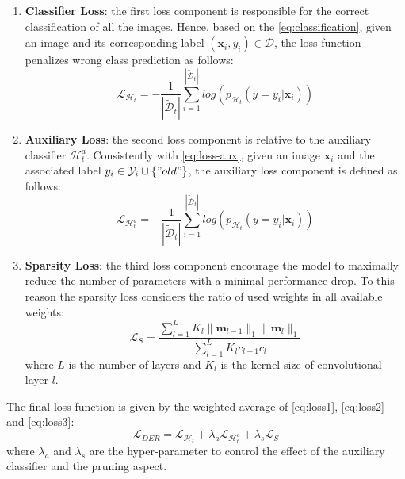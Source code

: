 \begin{enumerate}
    \item \textbf{Classifier Loss}: the first loss component is responsible for the correct classification of all the images. Hence, based on the \autoref{eq:classification}, given an image and its corresponding label $(\textbf{x}_i, y_i)\in \tilde{\mathcal{D}}$, the loss function penalizes wrong class prediction as follows:
    \begin{equation} \label{eq:loss1}
        \mathcal{L}_{\mathcal{H}_t} = - \frac{1}{|\tilde{\mathcal{D}}_t|}
            \sum_{i=1}^{|\tilde{\mathcal{D}}_t|}log(p_{\mathcal{H}_t}(y=y_i | \textbf{x}_i))
    \end{equation}
    \item \textbf{Auxiliary Loss}: the second loss component is relative to the auxiliary classifier $\mathcal{H}_t^a$. Consistently with \autoref{eq:loss-aux}, given an image $\textbf{x}_i$ and the associated label $y_i \in \mathcal{Y}_i \cup \{"old"\}$, the auxiliary loss component is defined as follows:
    \begin{equation} \label{eq:loss2}
        \mathcal{L}_{\mathcal{H}_t^a} = - \frac{1}{|\tilde{\mathcal{D}}_t|}
            \sum_{i=1}^{|\tilde{\mathcal{D}}_t|}log(p_{\mathcal{H}_t}(y=y_i | \textbf{x}_i))
    \end{equation}
    \item \textbf{Sparsity Loss}: the third loss component encourage the model to maximally reduce the number of parameters with a minimal performance drop. To this reason the sparsity loss considers the ratio of used weights in all available weights:
    \begin{equation} \label{eq:loss3}
        \mathcal{L}_S = \frac{\sum_{l=1}^L K_l \| \textbf{m}_{l-1} \|_1  \| \textbf{m}_{l} \|_1 }{\sum_{l=1}^L K_l c_{l-1} c_{l}}
    \end{equation}
    where $L$ is the number of layers and $K_l$ is the kernel size of convolutional layer $l$.
\end{enumerate}

The final loss function is given by the weighted average of \autoref{eq:loss1}, \autoref{eq:loss2} and \autoref{eq:loss3}:
\begin{equation}
    \mathcal{L}_{DER} = \mathcal{L}_{\mathcal{H}_t} + \lambda_a \mathcal{L}_{\mathcal{H}_t^a} + \lambda_s \mathcal{L}_{S}
\end{equation}
where $\lambda_a$ and $\lambda_s$ are the hyper-parameter to control the effect of the auxiliary classifier and the pruning aspect.


